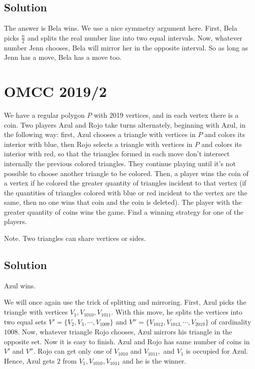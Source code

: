 \documentclass[blue,onecol]{shooting}
\begin{document}
\subsection{Solution}

The answer is Bela wins. We use a nice symmetry argument here. First, Bela picks $\frac{n}{2}$ and splits the real number line into two equal intervals. Now, whatever number Jenn chooses, Bela will mirror her in the opposite interval. So as long as Jenn has a move, Bela has a move too.

\section{OMCC 2019/2}

We have a regular polygon $P$ with 2019 vertices, and in each vertex there is a coin. Two players Azul and Rojo take turns alternately, beginning with Azul, in the following way: first, Azul chooses a triangle with vertices in $P$ and colors its interior with blue, then Rojo selects a triangle with vertices in $P$ and colors its interior with red, so that the triangles formed in each move don't intersect internally the previous colored triangles. They continue playing until it's not possible to choose another triangle to be colored. Then, a player wins the coin of a vertex if he colored the greater quantity of triangles incident to that vertex (if the quantities of triangles colored with blue or red incident to the vertex are the same, then no one wins that coin and the coin is deleted). The player with the greater quantity of coins wins the game. Find a winning strategy for one of the players.

Note. Two triangles can share vertices or sides.

\subsection{Solution}

Azul wins.

We will once again use the trick of splitting and mirroring. First, Azul picks the triangle with vertices $V_1, V_{1010}, V_{1011}.$ With this move, he splits the vertices into two equal sets $V' = \{V_2, V_3, \cdots, V_{1009} \}$ and $V'' =\{V_{1012}, V_{1013,} \cdots, V_{2019}\} $ of cardinality $1008.$ Now, whatever triangle Rojo chooses, Azul mirrors his triangle in the opposite set. Now it is easy to finish. Azul and Rojo has same number of coins in $V'$ and $V''.$ Rojo can get only one of $V_{1010}$ and $V_{1011},$ and $V_1$ is occupied for Azul. Hence, Azul gets $2$ from $V_1, V_{1010}, V_{1011}$ and he is the winner.
\end{document}
